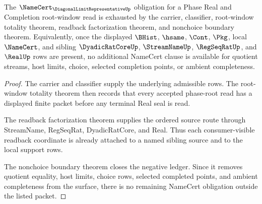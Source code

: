 \begin{theorem}
\label{thm:diagonal-limit-representative-phase-root-namecert-exhaustion}
The $\NameCert_{\DiagonalLimitRepresentativeUp}$ obligation for a Phase Real and Completion root-window read is exhausted by the carrier, classifier, root-window totality theorem, readback factorization theorem, and nonchoice boundary theorem. Equivalently, once the displayed $\BHist$, $\hsame$, $\Cont$, $\Pkg$, local $\NameCert$, and sibling $\DyadicRatCoreUp$, $\StreamNameUp$, $\RegSeqRatUp$, and $\RealUp$ rows are present, no additional NameCert clause is available for quotient streams, host limits, choice, selected completion points, or ambient completeness.
\end{theorem}
\begin{proof}
The carrier and classifier supply the underlying admissible rows. The root-window totality theorem then records that every accepted phase-root read has a displayed finite packet before any terminal Real seal is read.

The readback factorization theorem supplies the ordered source route through StreamName, RegSeqRat, DyadicRatCore, and Real. Thus each consumer-visible readback coordinate is already attached to a named sibling source and to the local support rows.

The nonchoice boundary theorem closes the negative ledger. Since it removes quotient equality, host limits, choice rows, selected completed points, and ambient completeness from the surface, there is no remaining NameCert obligation outside the listed packet.
\end{proof}

